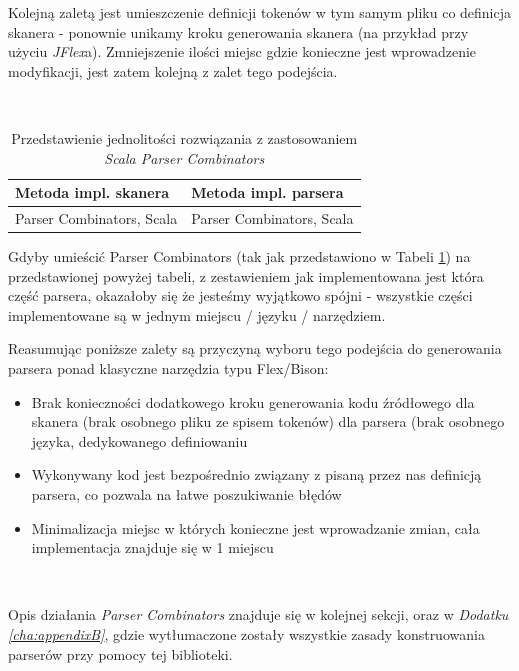 \documentclass[pdflatex,11pt]{aghdpl}
\begin{document}
Kolejną zaletą jest umieszczenie definicji tokenów w tym samym pliku co definicja skanera - ponownie unikamy kroku generowania 
skanera (na przykład przy użyciu \textit{JFlex}a). Zmniejszenie ilości miejsc gdzie konieczne jest wprowadzenie modyfikacji, jest zatem kolejną z zalet
tego podejścia.

~\\\*

\begin{table}[ch]
  \begin{center}
    \begin{tabular}{| l | l |}
      \hline
      Metoda impl. skanera & Metoda impl. parsera\\
      \hline
      Parser Combinators, Scala & Parser Combinators, Scala \\
      \hline
    \end{tabular}
    \caption{Przedstawienie jednolitości rozwiązania z zastosowaniem \textit{Scala Parser Combinators}}
  \end{center}
  \label{tab:scala_parsers_table}
\end{table}

Gdyby umieścić Parser Combinators (tak jak przedstawiono w Tabeli \ref{tab:scala_parsers_table}) na przedstawionej powyżej tabeli, z zestawieniem jak implementowana jest która część parsera,
okazałoby się że jesteśmy wyjątkowo spójni - wszystkie części implementowane są w jednym miejscu / języku / narzędziem.

Reasumując poniższe zalety są przyczyną wyboru tego podejścia do generowania parsera ponad klasyczne narzędzia typu Flex/Bison:
\begin{itemize}
 \item Brak konieczności dodatkowego kroku generowania kodu źródłowego
  \subitem dla skanera (brak osobnego pliku ze spisem tokenów)
  \subitem dla parsera (brak osobnego języka, dedykowanego definiowaniu
 \item Wykonywany kod jest bezpośrednio związany z pisaną przez nas definicją parsera, co pozwala na łatwe poszukiwanie błędów
 \item Minimalizacja miejsc w których konieczne jest wprowadzanie zmian, cała implementacja znajduje się w 1 miejscu
\end{itemize}


\begin{verbatim}
 
\end{verbatim}

Opis działania \textit{Parser Combinators} znajduje się w kolejnej sekcji, oraz w \textit{Dodatku \ref{cha:appendixB}}, gdzie wytłumaczone zostały wszystkie zasady
konstruowania parserów przy pomocy tej biblioteki.
\end{document}
